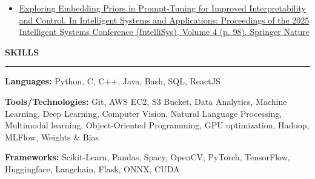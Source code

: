 \documentclass[9pt]{article}
\newcommand{\resumeSection}[1]{%
  \vspace{2pt}%
  \textbf{#1}\par
  \vspace{-5pt}%
  \rule{\linewidth}{0.3pt}\par
  \vspace{0pt}%
}
\newcommand{\resumeSubline}[1]{%
  #1\par
}
\begin{document}
\begin{itemize}
  \item \href{https://link.springer.com/chapter/10.1007/978-3-031-99965-9_7}{Exploring Embedding Priors in Prompt-Tuning for Improved Interpretability and Control. In Intelligent Systems and Applications: Proceedings of the 2025 Intelligent Systems Conference (IntelliSys), Volume 4 (p. 98). Springer Nature}
\end{itemize}

\resumeSection{SKILLS}

\resumeSubline{\textbf{Languages:} Python, C, C++, Java, Bash, SQL, ReactJS}
\resumeSubline{\textbf{Tools/Technologies:} Git, AWS EC2, S3 Bucket, Data Analytics, Machine Learning, Deep Learning, Computer Vision, Natural Language Processing, Multimodal learning, Object-Oriented Programming, GPU optimization, Hadoop, MLFlow, Weights \& Bias}
\resumeSubline{\textbf{Frameworks:} Scikit-Learn, Pandas, Spacy, OpenCV, PyTorch, TensorFlow, Huggingface, Langchain, Flask, ONNX, CUDA}
\end{document}
